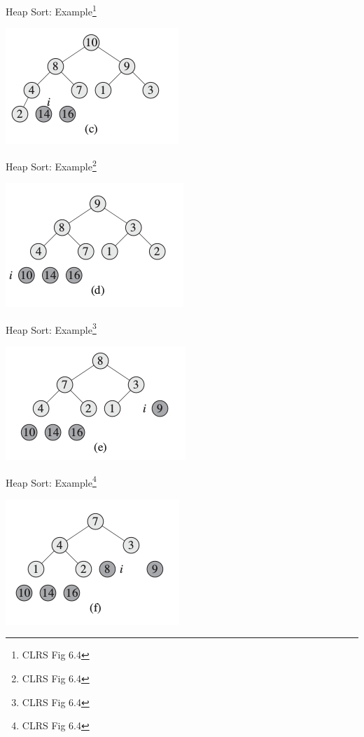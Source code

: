 \documentclass{beamer}
\begin{document}
\begin{frame}{Heap Sort: Example\footnote{CLRS Fig 6.4}}
    \begin{center}
        \includegraphics[scale=0.5]{heapSort3.png}
    \end{center}
\end{frame}


\begin{frame}{Heap Sort: Example\footnote{CLRS Fig 6.4}}
    \begin{center}
        \includegraphics[scale=0.5]{heapSort4.png}
    \end{center}
\end{frame}


\begin{frame}{Heap Sort: Example\footnote{CLRS Fig 6.4}}
    \begin{center}
        \includegraphics[scale=0.5]{heapSort5.png}
    \end{center}
\end{frame}


\begin{frame}{Heap Sort: Example\footnote{CLRS Fig 6.4}}
    \begin{center}
        \includegraphics[scale=0.5]{heapSort6.png}
    \end{center}
\end{frame}
\end{document}
